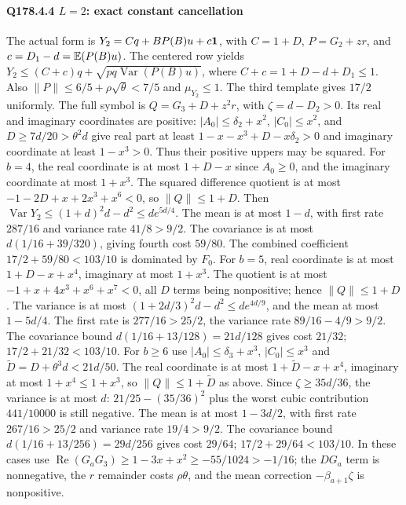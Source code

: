 \paragraph{Q178.4.4 $L=\allowbreak 2$: exact constant cancellation}
The actual form is
$Y_2=\allowbreak Cq+BP(B)u+c\mathbf1$, with
$C=\allowbreak 1+D$, $P=\allowbreak G_2+zr$, and $c=\allowbreak D_1-d=\allowbreak \mathbb E(P(B)u)$.
The centered row yields
$Y_2\le\allowbreak (C+c)q+\sqrt{pq\operatorname{Var}(P(B)u)}$,
where $C+c=\allowbreak 1+D-d+D_1\le\allowbreak 1$.
Also $\|P\|\le\allowbreak 6/5+\rho\sqrt\theta<\allowbreak 7/5$ and $\mu_{Y_2}\le\allowbreak 1$.
The third template gives $17/2$ uniformly.
The full symbol is $Q=\allowbreak G_3+D+z^2r$, with $\zeta=\allowbreak d-D_2>\allowbreak 0$.
Its real and imaginary coordinates are positive:
$|A_0|\le\allowbreak \delta_2+x^2$, $|C_0|\le\allowbreak  x^2$, and
$D\ge\allowbreak 7d/20>\allowbreak \theta^2d$ give real part at least
$1-x-x^3+D-x\delta_2>\allowbreak 0$ and imaginary coordinate at least $1-x^3>\allowbreak 0$.
Thus their positive uppers may be squared.
For $b=\allowbreak 4$, the real coordinate is at most $1+D-x$ since $A_0\ge\allowbreak 0$,
and the imaginary coordinate at most $1+x^3$.
The squared difference quotient is at most
$-1-2D+x+2x^3+x^6<\allowbreak 0$, so $\|Q\|\le\allowbreak 1+D$.
Then $\operatorname{Var}Y_2\le\allowbreak (1+d)^2d-d^2\le\allowbreak  de^{5d/4}$.
The mean is at most $1-d$, with first rate $287/16$ and variance
rate $41/8>\allowbreak 9/2$.
The covariance is at most $d(1/16+39/320)$, giving fourth cost
$59/80$. The combined coefficient $17/2+59/80<\allowbreak 103/10$ is dominated
by $F_0$.
For $b=\allowbreak 5$, real coordinate is at most $1+D-x+x^4$, imaginary at most
$1+x^3$. The quotient is at most $-1+x+4x^3+x^6+x^7<\allowbreak 0$, all $D$
terms being nonpositive; hence $\|Q\|\le\allowbreak 1+D$.
The variance is at most $(1+2d/3)^2d-d^2\le\allowbreak  de^{4d/9}$,
and the mean at most $1-5d/4$.
The first rate is $277/16>\allowbreak 25/2$, the variance rate
$89/16-4/9>\allowbreak 9/2$.
The covariance bound $d(1/16+13/128)=\allowbreak 21d/128$ gives cost $21/32$;
$17/2+21/32<\allowbreak 103/10$.
For $b\ge\allowbreak 6$ use $|A_0|\le\allowbreak \delta_3+x^3$, $|C_0|\le\allowbreak  x^3$ and
$\widetilde D=\allowbreak D+\theta^3d<\allowbreak 21d/50$.
The real coordinate is at most $1+\widetilde D-x+x^4$, imaginary at most
$1+x^4\le\allowbreak 1+x^3$, so $\|Q\|\le\allowbreak 1+\widetilde D$ as above.
Since $\zeta\ge\allowbreak 35d/36$, the variance is at most $d$:
$21/25-(35/36)^2$ plus the worst cubic contribution $441/10000$
is still negative.
The mean is at most $1-3d/2$, with first rate $267/16>\allowbreak 25/2$ and
variance rate $19/4>\allowbreak 9/2$.
The covariance bound $d(1/16+13/256)=\allowbreak 29d/256$ gives cost $29/64$;
$17/2+29/64<\allowbreak 103/10$.
In these cases use
$\operatorname{Re}(G_aG_3)\ge\allowbreak 1-3x+x^2\ge\allowbreak -55/1024>\allowbreak -1/16$;
the $DG_a$ term is nonnegative, the $r$ remainder costs $\rho\theta$,
and the mean correction $-\beta_{a+1}\zeta$ is nonpositive.

